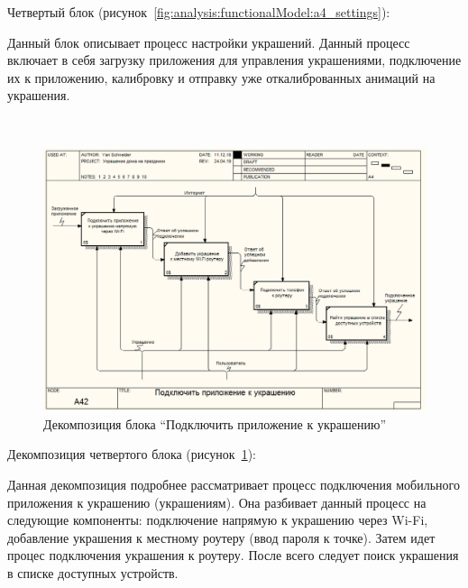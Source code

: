 Четвертый блок (рисунок~\ref{fig:analysis:functionalModel:a4_settings}):

Данный блок описывает процесс настройки украшений. Данный процесс включает в себя загрузку приложения для управления украшениями, подключение их к приложению, калибровку и отправку уже откалиброванных анимаций на украшения. 

~
\begin{figure}[H]
\centering
	\includegraphics[scale=0.45]{figures/functionalModel/a42_connecting.png}
	\caption{Декомпозиция блока \enquote{Подключить приложение к украшению}}
	\label{fig:analysis:functionalModel:a42_connecting}
\end{figure}

Декомпозиция четвертого блока (рисунок~\ref{fig:analysis:functionalModel:a42_connecting}):

Данная декомпозиция подробнее рассматривает процесс подключения мобильного приложения к украшению (украшениям). Она разбивает данный процесс на следующие компоненты: подключение напрямую к украшению через Wi-Fi, добавление украшения к местному роутеру (ввод пароля к точке). Затем идет процес подключения украшения к роутеру. После всего следует поиск украшения в списке доступных устройств.